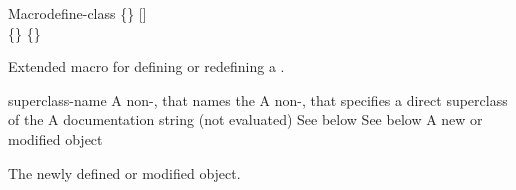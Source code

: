 \documentclass[10pt,twoside,english,pdftex]{article}
\begin{document}
\begin{functiondoc}{Macro}{define-class}{ 
   \code{(}\{\}\superstar\code{)}
   [] \\
   \code{(}\{\}\superstar\code{)}
   \{\}\superstar{} 
   \returns{} }
%
%
%

\fnsyntax

\fnpurpose Extended macro for defining or redefining a .

\fnpackage {}

\fnmodule {}

\fnargs
\begin{args}{superclass-name}
 A non-\nil,  that names the
 A non-\nil,  that specifies a
direct superclass of the  
\arg[documentation] A documentation string (not evaluated)
 See below
 See below
 A new or modified  object
\end{args}

\fnreturns The newly defined or modified  object.


\end{functiondoc}
\end{document}
